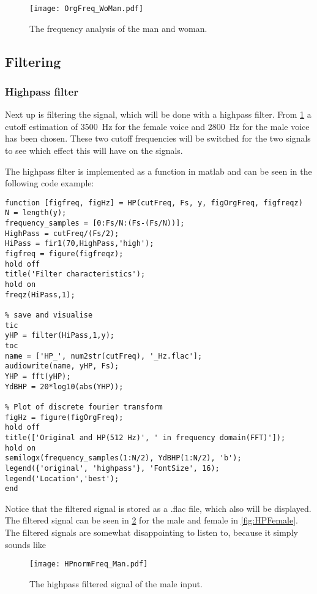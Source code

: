 \begin{figure}[h]
	\centering
	\texttt{[image: OrgFreq\_WoMan.pdf]}
	\caption{The frequency analysis of the man and woman.}
	\label{fig:WoManFFT}
\end{figure}


\subsection{Filtering}

\subsubsection{Highpass filter}
Next up is filtering the signal, which will be done with a highpass filter. From \cref{fig:WoManFFT} a cutoff estimation of \SI{3500}{\hertz} for the female voice and \SI{2800}{\hertz} for the male voice has been chosen. These two cutoff frequencies will be switched for the two signals to see which effect this will have on the signals.

The highpass filter is implemented as a function in matlab and can be seen in the following code example:

\begin{verbatim}
function [figfreq, figHz] = HP(cutFreq, Fs, y, figOrgFreq, figfreqz)
N = length(y);
frequency_samples = [0:Fs/N:(Fs-(Fs/N))];
HighPass = cutFreq/(Fs/2);
HiPass = fir1(70,HighPass,'high');
figfreq = figure(figfreqz);
hold off
title('Filter characteristics');
hold on
freqz(HiPass,1);

% save and visualise 
tic
yHP = filter(HiPass,1,y);
toc
name = ['HP_', num2str(cutFreq), '_Hz.flac'];
audiowrite(name, yHP, Fs);
YHP = fft(yHP);
YdBHP = 20*log10(abs(YHP));

% Plot of discrete fourier transform
figHz = figure(figOrgFreq);
hold off
title(['Original and HP(512 Hz)', ' in frequency domain(FFT)']);
hold on
semilogx(frequency_samples(1:N/2), YdBHP(1:N/2), 'b');
legend({'original', 'highpass'}, 'FontSize', 16);
legend('Location','best');
end
\end{verbatim}

Notice that the filtered signal is stored as a .flac file, which also will be displayed. The filtered signal can be seen in \cref{fig:HPMAle} for the male and female in \cref{fig:HPFemale}. The filtered signals are somewhat disappointing to listen to, because it simply sounds like 

\begin{figure}[h]
	\centering
	\texttt{[image: HPnormFreq\_Man.pdf]}
	\caption{The highpass filtered signal of the male input.}
	\label{fig:HPMAle}
\end{figure}

